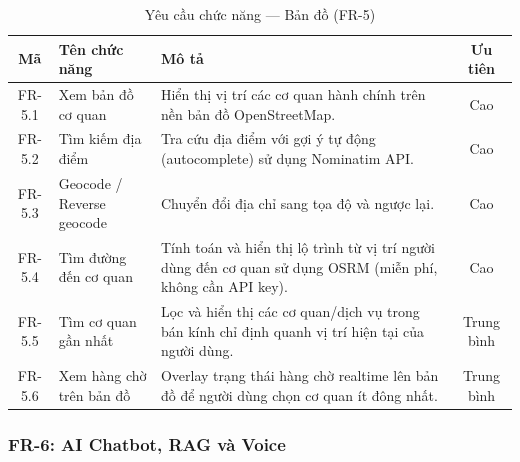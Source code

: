 \begin{table}[H]
\centering
\caption{Yêu cầu chức năng — Bản đồ (FR-5)}
\label{tab:fr-map}
\begin{tabularx}{\textwidth}{|c|l|X|c|}
\hline
\textbf{Mã} & \textbf{Tên chức năng} & \textbf{Mô tả} & \textbf{Ưu tiên} \\
\hline
FR-5.1 & Xem bản đồ cơ quan &
  Hiển thị vị trí các cơ quan hành chính trên nền bản đồ OpenStreetMap. &
  Cao \\
\hline
FR-5.2 & Tìm kiếm địa điểm &
  Tra cứu địa điểm với gợi ý tự động (autocomplete) sử dụng
  Nominatim API. &
  Cao \\
\hline
FR-5.3 & Geocode / Reverse geocode &
  Chuyển đổi địa chỉ sang tọa độ và ngược lại. &
  Cao \\
\hline
FR-5.4 & Tìm đường đến cơ quan &
  Tính toán và hiển thị lộ trình từ vị trí người dùng đến cơ quan
  sử dụng OSRM (miễn phí, không cần API key). &
  Cao \\
\hline
FR-5.5 & Tìm cơ quan gần nhất &
  Lọc và hiển thị các cơ quan/dịch vụ trong bán kính chỉ định
  quanh vị trí hiện tại của người dùng. &
  Trung bình \\
\hline
FR-5.6 & Xem hàng chờ trên bản đồ &
  Overlay trạng thái hàng chờ realtime lên bản đồ để người dùng
  chọn cơ quan ít đông nhất. &
  Trung bình \\
\hline
\end{tabularx}
\end{table}

\subsubsection{FR-6: AI Chatbot, RAG và Voice}

